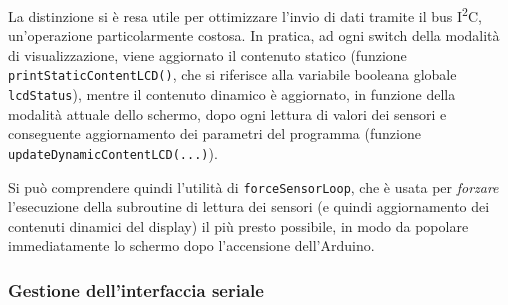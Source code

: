 \documentclass[12pt,a4paper]{article}
\begin{document}
La distinzione si è resa utile per ottimizzare l'invio di dati tramite il bus I\textsuperscript{2}C, un'operazione particolarmente costosa.
In pratica, ad ogni switch della modalità di visualizzazione, viene aggiornato il contenuto statico (funzione \verb|printStaticContentLCD()|, che si riferisce alla variabile booleana globale \verb|lcdStatus|), mentre il contenuto dinamico è aggiornato, in funzione della modalità attuale dello schermo, dopo ogni lettura di valori dei sensori e conseguente aggiornamento dei parametri del programma (funzione \verb|updateDynamicContentLCD(...)|).

Si può comprendere quindi l'utilità di \verb|forceSensorLoop|, che è usata per \textit{forzare} l'esecuzione della subroutine di lettura dei sensori (e quindi aggiornamento dei contenuti dinamici del display) il più presto possibile, in modo da popolare immediatamente lo schermo dopo l'accensione dell'Arduino.

\subsubsection{Gestione dell'interfaccia seriale}
\end{document}
